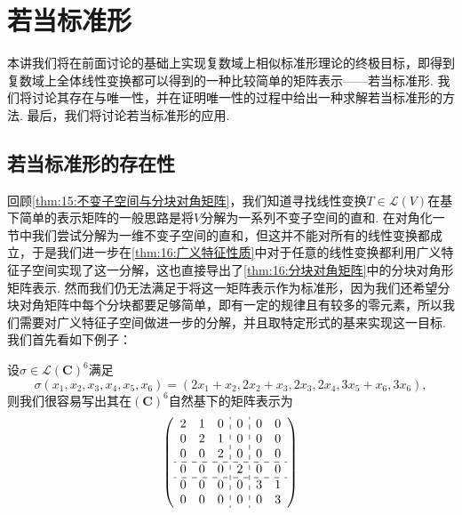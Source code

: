 \chapter{若当标准形}

本讲我们将在前面讨论的基础上实现复数域上相似标准形理论的终极目标，即得到复数域上全体线性变换都可以得到的一种比较简单的矩阵表示——若当标准形. 我们将讨论其存在与唯一性，并在证明唯一性的过程中给出一种求解若当标准形的方法. 最后，我们将讨论若当标准形的应用.

\section{若当标准形的存在性}
回顾\autoref{thm:15:不变子空间与分块对角矩阵}，我们知道寻找线性变换$T\in\mathcal{L}(V)$在基下简单的表示矩阵的一般思路是将$V$分解为一系列不变子空间的直和. 在对角化一节中我们尝试分解为一维不变子空间的直和，但这并不能对所有的线性变换都成立，于是我们进一步在\autoref{thm:16:广义特征性质}中对于任意的线性变换都利用广义特征子空间实现了这一分解，这也直接导出了\autoref{thm:16:分块对角矩阵}中的分块对角形矩阵表示. 然而我们仍无法满足于将这一矩阵表示作为标准形，因为我们还希望分块对角矩阵中每个分块都要足够简单，即有一定的规律且有较多的零元素，所以我们需要对广义特征子空间做进一步的分解，并且取特定形式的基来实现这一目标. 我们首先看如下例子：

\begin{example}
    设$\sigma\in\mathcal{L}(\mathbf{C})^6$满足
    \[\sigma(x_1,x_2,x_3,x_4,x_5,x_6)=(2x_1+x_2,2x_2+x_3,2x_3,2x_4,3x_5+x_6,3x_6),\]
    则我们很容易写出其在$(\mathbf{C})^6$自然基下的矩阵表示为
    \[\left(\begin{array}{ccc:c:cc}
        2 & 1 & 0 & 0 & 0 & 0\\
        0 & 2 & 1 & 0 & 0 & 0\\
        0 & 0 & 2 & 0 & 0 & 0\\
        \hdashline
        0 & 0 & 0 & 2 & 0 & 0\\
        \hdashline
        0 & 0 & 0 & 0 & 3 & 1\\
        0 & 0 & 0 & 0 & 0 & 3\\
        \end{array}\right)\]
\end{example}

